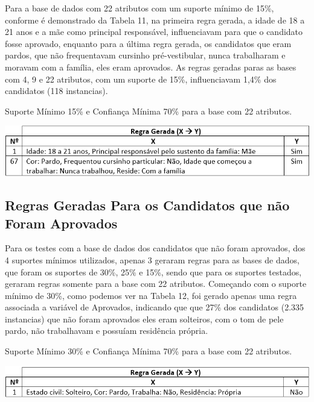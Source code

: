 \par
Para a base de dados com 22 atributos com um suporte mínimo de 15\%, conforme é demonstrado da Tabela 11, na primeira regra gerada, a idade de 18 a 21 anos e a mãe como principal responsável, influenciavam para que o candidato fosse aprovado, enquanto para a última regra gerada, os candidatos que eram pardos, que não frequentavam cursinho pré-vestibular, nunca trabalharam e moravam com a família, eles eram aprovados. As regras geradas paras as bases com 4, 9 e 22 atributos, com um suporte de 15\%, influenciavam 1,4\% dos candidatos (118 instancias).

\par
\begin{table}[!htp]
	\begin{center}
    \caption{\label{fig:waveform_fig} Suporte Mínimo 15\% e Confiança Mínima 70\% para a base com 22 atributos.}
	\includegraphics[scale=0.75]{Figuras/Suporte_15_atributos_22.png}
	\end{center}
\end{table}



\subsection{Regras Geradas Para os Candidatos que não Foram Aprovados}


\par
Para os testes com a base de dados dos candidatos que não foram aprovados, dos 4 suportes mínimos utilizados, apenas 3 geraram regras para as bases de dados, que foram os suportes de 30\%, 25\% e 15\%, sendo que para os suportes testados, geraram regras somente para a base com 22 atributos. Começando com o suporte mínimo de 30\%, como podemos ver na Tabela 12, foi gerado apenas uma regra associada a variável de Aprovados, indicando que que 27\% dos candidatos (2.335 instancias) que não foram aprovados eles eram solteiros, com o tom de pele pardo, não trabalhavam e possuíam residência própria.


\par
\begin{table}[!htp]
	\begin{center}
    \caption{\label{fig:waveform_fig} Suporte Mínimo 30\% e Confiança Mínima 70\% para a base com 22 atributos.}
	\includegraphics[scale=0.75]{Figuras/Suporte_30_Nao_atributos_22.png}
	\end{center}
\end{table}

